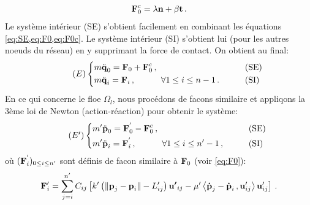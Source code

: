 \begin{align}  \label{eq:F0c}
    \bm{\mathrm{F}}_0^c = \lambda \bm{\mathrm{n}} + \beta \bm{\mathrm{t}} \,.
\end{align}
Le système intérieur (SE) s'obtient facilement en combinant les équations \cref{eq:SE,eq:F0,eq:F0c}. Le système intérieur (SI) s'obtient lui (pour les autres noeuds du réseau) en y supprimant la force de contact. On obtient au final:
\begin{align} \tag{$E$} \label{eq:e}
\begin{dcases}
    m \ddot{\bm{\mathrm{q}}}_0 = \bm{\mathrm{F}}_0 + \bm{\mathrm{F}}^c_0  \,, &\qquad \text{(SE)} \\
    m \ddot{\bm{\mathrm{q}}}_i = \bm{\mathrm{F}}_i   \,, \quad \quad \quad \forall 1 \leq i \leq n-1 \,. &\qquad \text{(SI)}
\end{dcases}
\end{align}
En ce qui concerne le floe $\Omega_l$, nous procédons de facons similaire et appliqons la 3ème loi de Newton (action-réaction) pour obtenir le système:
\begin{align} \tag{$E'$} \label{eq:eprime}
\begin{dcases}
    m' \ddot{\bm{\mathrm{p}}}_0 = \bm{\mathrm{F}}^{'}_0 - \bm{\mathrm{F}}^c_0  \,, &\qquad \text{(SE)} \\
    m' \ddot{\bm{\mathrm{p}}}_i = \bm{\mathrm{F}}^{'}_i   \,, \quad \quad \quad \forall 1 \leq i \leq n'-1 \,, &\qquad \text{(SI)}
\end{dcases}
\end{align}
où $(\bm{\mathrm{F}}^{'}_i)_{0 \leq i \leq n'}$ sont définis de facon similaire à $\bm{\mathrm{F}}_0$ (voir \cref{eq:F0}):
\begin{align}
    \bm{\mathrm{F}}'_i = \sum_{j=i}^{n'}C_{ij} \left[ k' \left( \Vert \bm{\mathrm{p}}_j - \bm{\mathrm{p}}_i \Vert - L'_{ij} \right) \bm{\mathrm{u'}}_{ij} - \mu' \left\langle \bm{\mathrm{\dot{p}}}_j - \bm{\mathrm{\dot{p}}}_i\,, \bm{\mathrm{u}}'_{ij}  \right\rangle  \bm{\mathrm{u}}'_{ij}  \right] \,.
\end{align}

